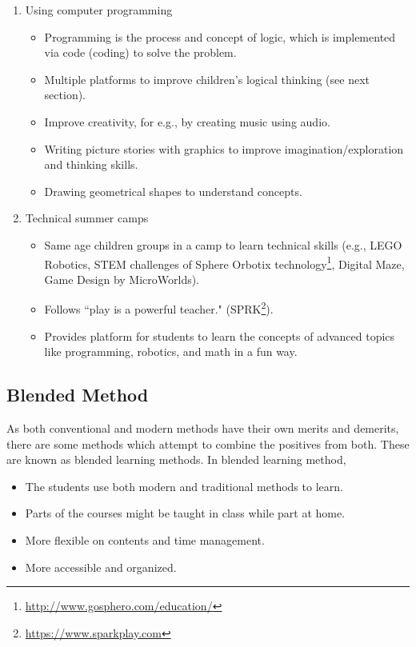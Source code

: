 \begin{enumerate}
\begin{itemize}
\end{itemize}

\item Using computer programming

\begin{itemize}
\item Programming is the process and concept of logic, which is implemented via code (coding) to solve the problem.

\item Multiple platforms to improve children's logical thinking (see next section).
\item Improve creativity, for e.g., by creating music using audio.
\item Writing picture stories with graphics to improve imagination/exploration and thinking skills.
\item Drawing geometrical shapes to understand concepts.

\end{itemize}

\item Technical summer camps

\begin{itemize}
\item Same age children groups in a camp to learn technical skills (e.g., LEGO Robotics, STEM challenges of Sphere Orbotix technology\footnote{\url{http://www.gosphero.com/education/}}, Digital Maze, Game Design by MicroWorlds).
\item Follows “play is a powerful teacher." (SPRK\footnote{\url{https://www.sparkplay.com}}). 
\item Provides platform for students to learn the concepts of advanced topics like programming, robotics, and math in a fun way.


\end{itemize}

\end{enumerate}

\subsection[Blended]{Blended Method}

As both conventional and modern methods have their own merits and demerits, there are some methods which attempt to combine the positives from both. These are known as blended learning methods. In blended learning method, 

\begin{itemize}
	\item The students use both modern and traditional methods to learn. 
	\item Parts of the courses might be taught in class while part at home. 
	\item More flexible on contents and time management. 
	\item More accessible and organized.
\end{itemize}

